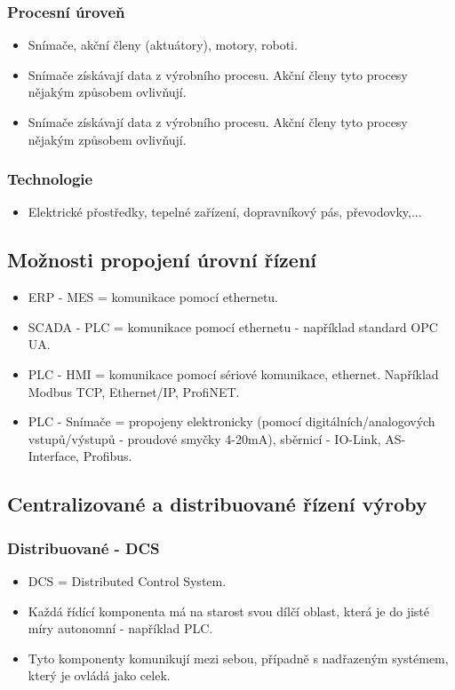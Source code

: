 \subsubsection*{Procesní úroveň}
\begin{itemize}
    \item Snímače, akční členy (aktuátory), motory, roboti.
    \item Snímače získávají data z výrobního procesu. Akční členy tyto procesy nějakým způsobem ovlivňují. 
    \item Snímače získávají data z výrobního procesu. Akční členy tyto procesy nějakým způsobem ovlivňují.
\end{itemize}

\subsubsection*{Technologie}
\begin{itemize}
    \item Elektrické přostředky, tepelné zařízení, dopravníkový pás, převodovky,...
\end{itemize}

\subsection{Možnosti propojení úrovní řízení}
\begin{itemize}
    \item ERP - MES = komunikace pomocí ethernetu.
    \item SCADA - PLC = komunikace pomocí ethernetu - například standard OPC UA.
    \item PLC - HMI = komunikace pomocí sériové komunikace, ethernet. Například Modbus TCP, Ethernet/IP, ProfiNET.
    \item PLC - Snímače = propojeny elektronicky (pomocí digitálních/analogových vstupů/výstupů - proudové smyčky 4-20mA), sběrnicí - IO-Link, AS-Interface, Profibus.
\end{itemize}

\subsection{Centralizované a distribuované řízení výroby}
\subsubsection*{Distribuované - DCS}
\begin{itemize}
    \item DCS = Distributed Control System.
    \item Každá řídící komponenta má na starost svou dílčí oblast, která je do jisté míry autonomní - například PLC.
    \item Tyto komponenty komunikují mezi sebou, případně s nadřazeným systémem, který je ovládá jako celek.
\end{itemize}

